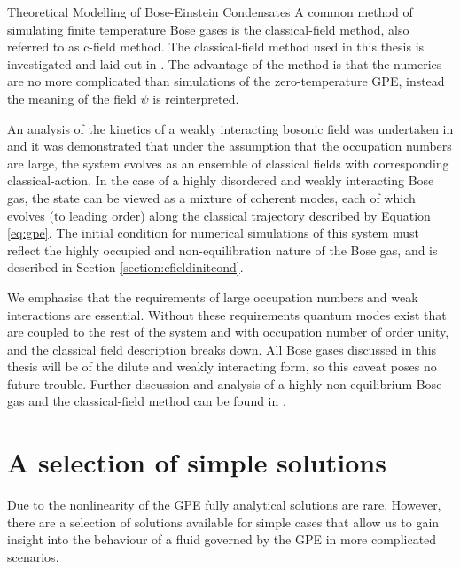 \begin{chapter}{\label{cha:theoretical_model}Theoretical Modelling of Bose-Einstein Condensates}
A common method of simulating finite temperature Bose gases is the classical-field method, also referred to as c-field method. The classical-field method used in this thesis is investigated and laid out in \cite{PhysRevA.66.013603}. The advantage of the method is that the numerics are no more complicated than simulations of the zero-temperature GPE, instead the meaning of the field $\psi$ is reinterpreted.

An analysis of the kinetics of a weakly interacting bosonic field was undertaken in \cite{PhysRev.147.214} and it was demonstrated that under the assumption that the occupation numbers are large, the system evolves as an ensemble of classical fields with corresponding classical-action. In the case of a highly disordered and weakly interacting Bose gas, the state can be viewed as a mixture of coherent modes, each of which evolves (to leading order) along the classical trajectory described by Equation \ref{eq:gpe}. The initial condition for numerical simulations of this system must reflect the highly occupied and non-equilibration nature of the Bose gas, and is described in Section \ref{section:cfieldinitcond}.

We emphasise that the requirements of large occupation numbers and weak interactions are essential. Without these requirements quantum modes exist that are coupled to the rest of the system and with occupation number of order unity, and the classical field description breaks down. All Bose gases discussed in this thesis will be of the dilute and weakly interacting form, so this caveat poses no future trouble. Further discussion and analysis of a highly non-equilibrium Bose gas and the classical-field method can be found in \cite{PhysRevA.66.013603}.

\section{\label{section:solutions} A selection of simple solutions}
	Due to the nonlinearity of the GPE fully analytical solutions are rare. However, there are a selection of solutions available for simple cases that allow us to gain insight into the behaviour of a fluid governed by the GPE in more complicated scenarios.

\end{chapter}
